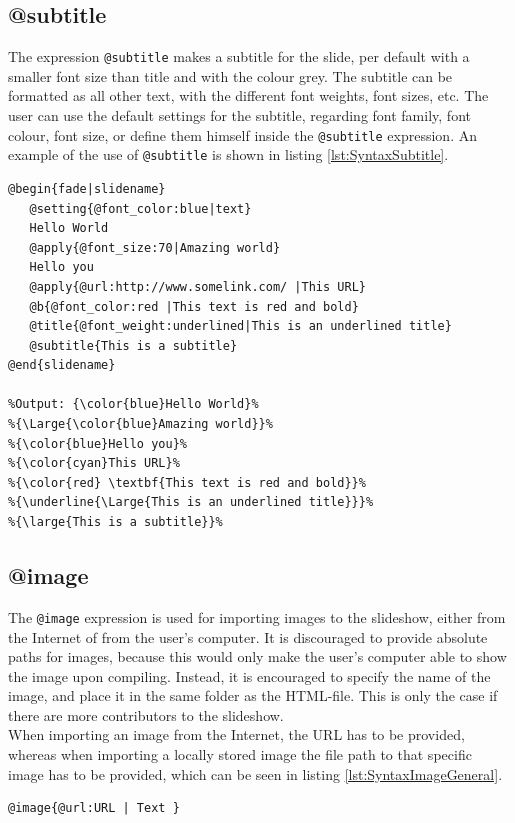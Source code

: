 {\subsection{@subtitle}
The expression \lstinline!@subtitle! makes a subtitle for the slide, per default with a smaller font size than title and with the colour grey. The subtitle can be formatted as all other text, with the different font weights, font sizes, etc. The user can use the default settings for the subtitle, regarding font family, font colour, font size, or define them himself inside the \lstinline!@subtitle! expression.
An example of the use of \lstinline!@subtitle! is shown in listing \ref{lst:SyntaxSubtitle}.
\begin{lstlisting}[frame=single, caption=Hello World with subtitle, label=lst:SyntaxSubtitle]
@begin{fade|slidename}
   @setting{@font_color:blue|text}
   Hello World
   @apply{@font_size:70|Amazing world}
   Hello you
   @apply{@url:http://www.somelink.com/ |This URL}
   @b{@font_color:red |This text is red and bold}
   @title{@font_weight:underlined|This is an underlined title}
   @subtitle{This is a subtitle}
@end{slidename}

%Output: {\color{blue}Hello World}%
%{\Large{\color{blue}Amazing world}}%
%{\color{blue}Hello you}%
%{\color{cyan}This URL}%
%{\color{red} \textbf{This text is red and bold}}%
%{\underline{\Large{This is an underlined title}}}%
%{\large{This is a subtitle}}%
\end{lstlisting}

\subsection{@image}
The \lstinline!@image! expression is used for importing images to the slideshow, either from the Internet of from the user's computer.
It is discouraged to provide absolute paths for images, because this would only make the user's computer able to show the image upon compiling. Instead, it is encouraged to specify the name of the image, and place it in the same folder as the HTML-file. This is only the case if there are more contributors to the slideshow.\\
When importing an image from the Internet, the URL has to be provided, whereas when importing a locally stored image the file path to that specific image has to be provided, which can be seen in listing \ref{lst:SyntaxImageGeneral}.

\begin{lstlisting}[frame=single, caption=Generic \texttt{image} expression example, label=lst:SyntaxImageGeneral]
@image{@url:URL | Text }
\end{lstlisting}

}
